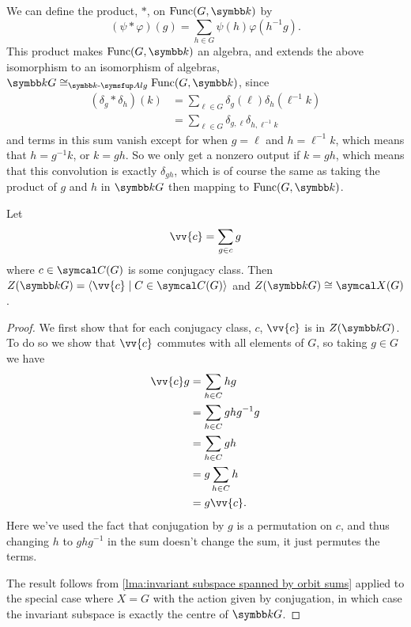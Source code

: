 We can define the  product, \(*\), on \(\Func(G, \field)\) by
\begin{equation}
    (\psi * \varphi)(g) = \sum_{h \in G} \psi(h) \varphi(h^{-1}g).
\end{equation}
This product makes \(\Func(G, \field)\) an algebra, and extends the above isomorphism to an isomorphism of algebras, \(\field G \isomorphic_{\Alg} \Func(G, \field)\), since
\begin{align}
    (\delta_g * \delta_h)(k) &= \sum_{\ell \in G} \delta_g(\ell) \delta_h(\ell^{-1}k)\\
    &= \sum_{\ell \in G} \delta_{g,\ell} \delta_{h,\ell^{-1}k}
\end{align}
and terms in this sum vanish except for when \(g = \ell\) and \(h = \ell^{-1}k\), which means that \(h = g^{-1}k\), or \(k = gh\).
So we only get a nonzero output if \(k = gh\), which means that this convolution is exactly \(\delta_{gh}\), which is of course the same as taking the product of \(g\) and \(h\) in \(\field G\) then mapping to \(\Func(G, \field)\).

\begin{prp}{}{}
    Let
    \begin{equation}
        \vv{c} = \sum_{g \in c} g
    \end{equation}
    where \(c \in \conjugacyClasses(G)\) is some conjugacy class.
    Then \(Z(\field G) = \langle \vv{c} \mid C \in \conjugacyClasses(G) \rangle\) and \(Z(\field G) \isomorphic \classFunctions(G)\).
    \begin{proof}
        We first show that for each conjugacy class, \(c\), \(\vv{c}\) is in \(Z(\field G)\).
        To do so we show that \(\vv{c}\) commutes with all elements of \(G\), so taking \(g \in G\) we have
        \begin{align}
            \vv{c}g &= \sum_{h \in C} hg\\
            &= \sum_{h \in C} ghg^{-1}g\\
            &= \sum_{h \in C} gh\\
            &= g \sum_{h \in C} h\\
            &= g\vv{c}. 
        \end{align}
        Here we've used the fact that conjugation by \(g\) is a permutation on \(c\), and thus changing \(h\) to \(ghg^{-1}\) in the sum doesn't change the sum, it just permutes the terms.
        
        The result follows from \cref{lma:invariant subspace spanned by orbit sums} applied to the special case where \(X = G\) with the action given by conjugation, in which case the invariant subspace is exactly the centre of \(\field G\).
    \end{proof}
\end{prp}

